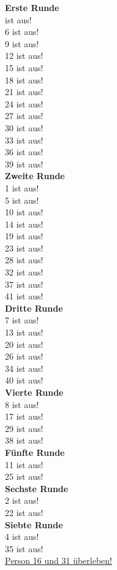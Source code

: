 \documentclass[titlepage]{article}
\newcommand{\n}{\newline}
\begin{document}
			\begin{multicols}{1}
			\noindent
			\textbf{Erste Runde}\\
			 ist aus!\\
			6 ist aus!\\
			9 ist aus!\\
			12 ist aus!\\
			15 ist aus!\\
			18 ist aus!\\
			21 ist aus!\\
			24 ist aus!\\
			27 ist aus!\\
			30 ist aus!\\
			33 ist aus!\\
			36 ist aus!\\
			39 ist aus!\\
			\n
			\textbf{Zweite Runde}\\
			1 ist aus!\\
			5 ist aus!\\
			10 ist aus!\\
			14 ist aus!\\
			19 ist aus!\\
			23 ist aus!\\
			28 ist aus!\\
			32 ist aus!\\
			37 ist aus!\\
			41 ist aus!\\
			
			\noindent
			\textbf{Dritte Runde}\\
			7 ist aus!\\
			13 ist aus!\\
			20 ist aus!\\
			26 ist aus!\\
			34 ist aus!\\
			40 ist aus!\\
			\n
			\textbf{Vierte Runde}\\
			8 ist aus!\\
			17 ist aus!\\
			29 ist aus!\\
			38 ist aus!\\
			\n
			\textbf{Fünfte Runde}\\
			11 ist aus!\\
			25 ist aus!\\
			\n
			\textbf{Sechste Runde}\\
			2 ist aus!\\
			22 ist aus!\\
			\n
			\textbf{Siebte Runde}\\
			4 ist aus!\\
			35 ist aus!\\
			\n
			\underline{\underline{Person 16 und 31 überleben!}}
			\end{multicols}
			
\end{document}
